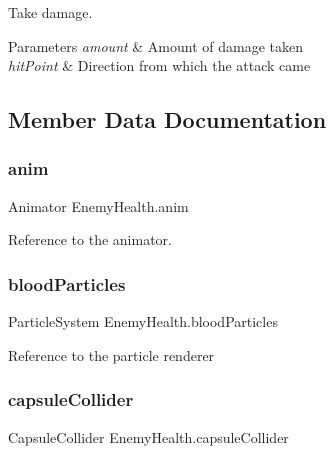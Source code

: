 Take damage. 


\begin{DoxyParams}{Parameters}
{\em amount} & Amount of damage taken \\
\hline
{\em hit\+Point} & Direction from which the attack came \\
\hline
\end{DoxyParams}


\subsection{Member Data Documentation}
\mbox{\label{class_enemy_health_a87ac641128bbd5abf5db6cc3f7bf9a87}} 
\subsubsection{\texorpdfstring{anim}{anim}}
{\footnotesize\ttfamily Animator Enemy\+Health.\+anim\hspace{0.3cm}{\ttfamily [private]}}

Reference to the animator. \mbox{\label{class_enemy_health_a1999eda4199231ee458052e6fca2f6bc}} 
\subsubsection{\texorpdfstring{bloodParticles}{bloodParticles}}
{\footnotesize\ttfamily Particle\+System Enemy\+Health.\+blood\+Particles\hspace{0.3cm}{\ttfamily [private]}}

Reference to the particle renderer \mbox{\label{class_enemy_health_acf69b8ae9a92c09beea9f41d1aef78b1}} 
\subsubsection{\texorpdfstring{capsuleCollider}{capsuleCollider}}
{\footnotesize\ttfamily Capsule\+Collider Enemy\+Health.\+capsule\+Collider\hspace{0.3cm}{\ttfamily [private]}}

